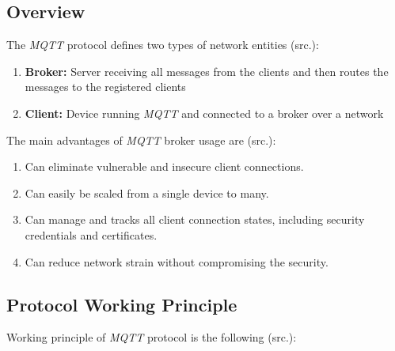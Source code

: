 \documentclass[report.tex]{subfiles}
\begin{document}
\subsection{Overview}

\begin{flushleft}
The \textit{MQTT} protocol defines two types of network entities (src.\cite{MQTT}):
\end{flushleft}
\begin{enumerate}
\item \textbf{Broker:} Server receiving all messages from the clients and then routes the messages to the registered clients
\item \textbf{Client:} Device running \textit{MQTT} and connected to a broker over a network
\end{enumerate}

\begin{flushleft}
The main advantages of \textit{MQTT} broker usage are (src.\cite{MQTT}):
\end{flushleft}
\begin{enumerate}
\item Can eliminate vulnerable and insecure client connections. 
\item Can easily be scaled from a single device to many.
\item Can manage and tracks all client connection states, including security credentials and certificates.
\item Can reduce network strain without compromising the security.
\end{enumerate}

\subsection{Protocol Working Principle}
\begin{flushleft}
Working principle of \textit{MQTT} protocol is the following (src.\cite{MQTT}):
\end{flushleft}
\end{document}
